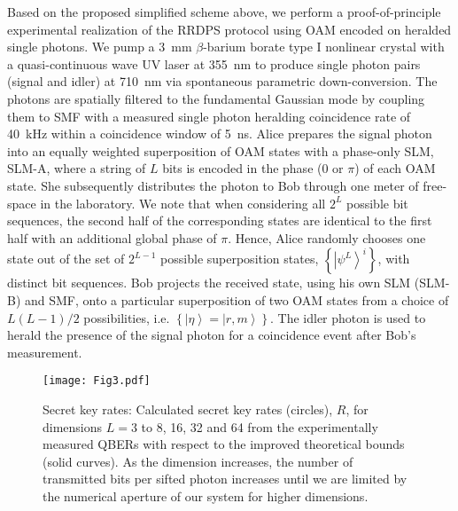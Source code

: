 \documentclass[twocolumn,aps,prl,floatfix,superscriptaddress]{revtex4-1}
\newcommand{\ket}[1]{\left| #1 \right\rangle}
\begin{document}
Based on the proposed simplified scheme above, we perform a proof-of-principle experimental realization of the RRDPS protocol using OAM encoded on heralded single photons. We pump a 3~mm $\beta$-barium borate type I nonlinear crystal with a quasi-continuous wave UV laser at 355~nm to produce single photon pairs (signal and idler) at 710~nm via spontaneous parametric down-conversion. The photons are spatially filtered to the fundamental Gaussian mode by coupling them to SMF with a measured single photon heralding coincidence rate of 40~kHz within a coincidence window of 5~ns. Alice prepares the signal photon into an equally weighted superposition of OAM states with a phase-only SLM, SLM-A, where a string of $L$ bits is encoded in the phase (0 or $\pi$) of each OAM state. She subsequently distributes the photon to Bob through one meter of free-space in the laboratory. We note that when considering all $2^L$ possible bit sequences, the second half of the corresponding states are identical to the first half with an additional global phase of $\pi$. Hence, Alice randomly chooses one state out of the set of $2^{L-1}$ possible superposition states, $\left\{ \ket{\psi^L}^i \right\}$, with distinct bit sequences. Bob projects the received state, using his own SLM (SLM-B) and SMF, onto a particular superposition of two OAM states from a choice of $L(L-1)/2$ possibilities, i.e. $\left\{ \ket{\eta} = \ket{r,m} \right\}$. The idler photon is used to herald the presence of the signal photon for a coincidence event after Bob's measurement.

\begin{figure}
	\begin{center}
	\texttt{[image: Fig3.pdf]}
	\caption[]{Secret key rates: Calculated secret key rates (circles), $R$, for dimensions $L=3$ to 8, 16, 32 and 64 from the experimentally measured QBERs with respect to the improved theoretical bounds (solid curves). As the dimension increases, the number of transmitted bits per sifted photon increases until we are limited by the numerical aperture of our system for higher dimensions.}%
	\label{fig:fig3}
	\end{center}
\end{figure}
\end{document}
